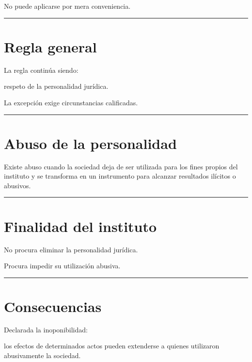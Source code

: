 \documentclass[
  spanish,
  letterpaper,
  DIV=11,
  numbers=noendperiod]{scrartcl}
\begin{document}
No puede aplicarse por mera conveniencia.

\begin{center}\rule{0.5\linewidth}{0.5pt}\end{center}

\section{Regla general}\label{regla-general}

La regla continúa siendo:

respeto de la personalidad jurídica.

La excepción exige circunstancias calificadas.

\begin{center}\rule{0.5\linewidth}{0.5pt}\end{center}

\section{Abuso de la personalidad}\label{abuso-de-la-personalidad}

Existe abuso cuando la sociedad deja de ser utilizada para los fines
propios del instituto y se transforma en un instrumento para alcanzar
resultados ilícitos o abusivos.

\begin{center}\rule{0.5\linewidth}{0.5pt}\end{center}

\section{Finalidad del instituto}\label{finalidad-del-instituto}

No procura eliminar la personalidad jurídica.

Procura impedir su utilización abusiva.

\begin{center}\rule{0.5\linewidth}{0.5pt}\end{center}

\section{Consecuencias}\label{consecuencias}

Declarada la inoponibilidad:

los efectos de determinados actos pueden extenderse a quienes utilizaron
abusivamente la sociedad.
\end{document}
